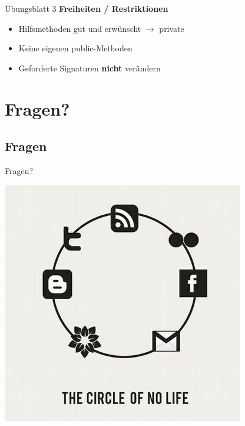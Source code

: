 \documentclass[18pt]{beamer}
\begin{document}
\begin{frame}{Übungsblatt 3}
	\textbf{Freiheiten / Restriktionen}
	
	\begin{itemize}
		\item Hilfsmethoden gut und erwünscht $\rightarrow$ private
		\item Keine eigenen public-Methoden
		\item Geforderte Signaturen \textbf{nicht} verändern
	\end{itemize}
\end{frame}


\section{Fragen?}
\subsection*{Fragen} %
\begin{frame}	
	\begin{center}
		\huge{Fragen?}
	\end{center}
\end{frame}



\begin{frame}[full]
\includegraphics[scale=0.55]{bilder/comics/September-25-2011-18-44-59-aa71ce1bd67502c27bc56a6b8d724897.jpeg}
\end{frame}
\end{document}
